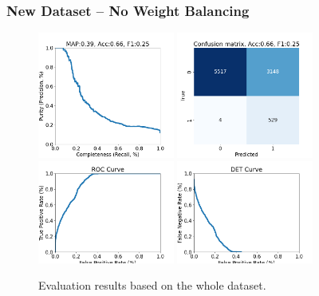 \documentclass[DM,authoryear,toc]{lsstdoc}
\begin{document}
\clearpage
\subsubsection{New Dataset -- No Weight Balancing}

\begin{figure}[h]
  \centering
  \includegraphics[width=0.4\textwidth]{precrec_13-resnet50-FullAugmentation-scratch-B64__0255000__npy_data_0.1.2-0sigma_256by256__posw_1.png}
  \includegraphics[width=0.4\textwidth]{confmat_13-resnet50-FullAugmentation-scratch-B64__0255000__npy_data_0.1.2-0sigma_256by256__posw_1.png}
  \includegraphics[width=0.4\textwidth]{roc_13-resnet50-FullAugmentation-scratch-B64__0255000__npy_data_0.1.2-0sigma_256by256__posw_1.png}
  \includegraphics[width=0.4\textwidth]{det_13-resnet50-FullAugmentation-scratch-B64__0255000__npy_data_0.1.2-0sigma_256by256__posw_1.png}
  \caption{Evaluation results based on the whole dataset.}
  \label{fig:tract_templates}
\end{figure}
\end{document}

